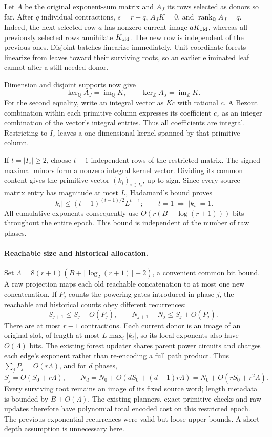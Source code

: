 Let $A$ be the original exponent-sum matrix and $A_J$ its rows selected as
donors so far. After $q$ individual contractions, $s=r-q$, $A_JK=0$, and
$\operatorname{rank}_{\mathbb Q}A_J=q$. Indeed, the next selected row $a$
has nonzero current image $aK_{\rm old}$, whereas all previously selected
rows annihilate $K_{\rm old}$. The new row is independent of the previous
ones. Disjoint batches linearize immediately. Unit-coordinate forests
linearize from leaves toward their surviving roots, so an earlier eliminated
leaf cannot alter a still-needed donor.

Dimension and disjoint supports now give
\[
 \ker_{\mathbb Q}A_J=\operatorname{im}_{\mathbb Q}K,
 \qquad
 \ker_{\mathbb Z}A_J=\operatorname{im}_{\mathbb Z}K.
\]
For the second equality, write an integral vector as $Kc$ with rational
$c$. A Bezout combination within each primitive column expresses its
coefficient $c_z$ as an integer combination of the vector's integral entries.
Thus all coefficients are integral. Restricting to $I_z$ leaves a
one-dimensional kernel spanned by that primitive column.

If $t=|I_z|\ge2$, choose $t-1$ independent rows of the restricted matrix.
The signed maximal minors form a nonzero integral kernel vector. Dividing
its common content gives the primitive vector $(k_i)_{i\in I_z}$, up to sign.
Since every source matrix entry has magnitude at most $L$, Hadamard's bound
proves
\[
 |k_i|\le(t-1)^{(t-1)/2}L^{t-1};
 \qquad t=1\ \Longrightarrow\ |k_i|=1.
\]
All cumulative exponents consequently use
$O(r(B+\log(r+1)))$ bits throughout the entire epoch. This bound is
independent of the number of raw phases.

\paragraph{Reachable size and historical allocation.}
Set $\Lambda=8(r+1)(B+\lceil\log_2(r+1)\rceil+2)$, a convenient common
bit bound. A raw projection maps each old reachable concatenation to at most
one new concatenation. If $P_j$ counts the powering gates introduced in phase
$j$, the reachable and historical counts obey different recurrences:
\[
 S_{j+1}\le S_j+O(P_j),\qquad
 N_{j+1}-N_j\le S_j+O(P_j).
\]
There are at most $r-1$ contractions. Each current donor is an image of an
original slot, of length at most $L\max_i|k_i|$, so its local exponents also
have $O(\Lambda)$ bits. The existing forest updater shares parent power
circuits and charges each edge's exponent rather than re-encoding a full
path product. Thus $\sum_jP_j=O(r\Lambda)$, and for $d$ phases,
\[
 S_j=O(S_0+r\Lambda),\qquad
 N_d=N_0+O(dS_0+(d+1)r\Lambda)
     =N_0+O(rS_0+r^2\Lambda).
\]
Every surviving root remains an image of its fixed source word; length
metadata is bounded by $B+O(\Lambda)$. The existing planners, exact primitive
checks and raw updates therefore have polynomial total encoded cost on this
restricted epoch. The previous exponential recurrences were valid but loose
upper bounds. A short-depth assumption is unnecessary here.

